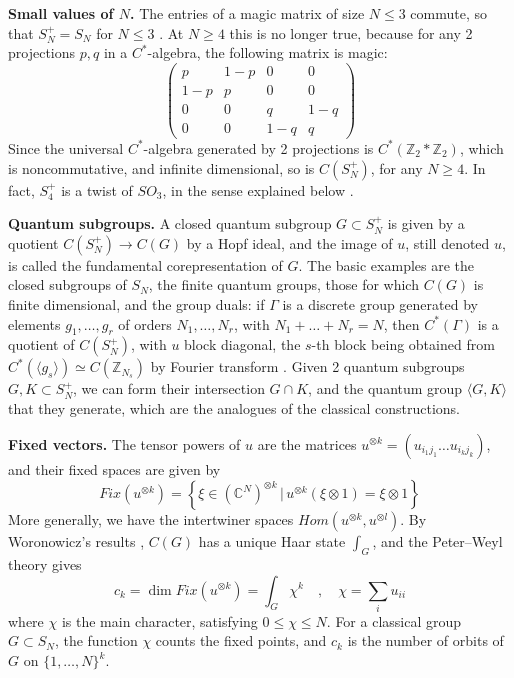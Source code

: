 \documentclass[11pt]{amsart}
\begin{document}
\medskip

\noindent\textbf{Small values of $N$.} The entries of a magic matrix of size $N\leq3$ commute, so that $S_N^+=S_N$ for $N\leq3$ \cite{wa1}. At $N\geq4$ this is no longer true, because for any 2 projections $p,q$ in a $C^*$-algebra, the following matrix is magic:
$$\begin{pmatrix}p&1-p&0&0\\1-p&p&0&0\\0&0&q&1-q\\0&0&1-q&q\end{pmatrix}$$
Since the universal $C^*$-algebra generated by 2 projections is $C^*(\mathbb Z_2*\mathbb Z_2)$, which is noncommutative, and infinite dimensional, so is $C(S_N^+)$, for any $N\geq4$. In fact, $S_4^+$ is a twist of $SO_3$, in the sense explained below \cite{bb2}.

\medskip

\noindent\textbf{Quantum subgroups.} A closed quantum subgroup $G\subset S_N^+$ is given by a quotient $C(S_N^+)\to C(G)$ by a Hopf ideal, and the image of $u$, still denoted $u$, is called the fundamental corepresentation of $G$. The basic examples are the closed subgroups of $S_N$, the finite quantum groups, those for which $C(G)$ is finite dimensional, and the group duals: if $\Gamma$ is a discrete group generated by elements $g_1,\ldots,g_r$ of orders $N_1,\ldots,N_r$, with $N_1+\ldots+N_r=N$, then $C^*(\Gamma)$ is a quotient of $C(S_N^+)$, with $u$ block diagonal, the $s$-th block being obtained from $C^*(\langle g_s\rangle)\simeq C(\mathbb Z_{N_s})$ by Fourier transform \cite{bi1}. Given 2 quantum subgroups $G,K\subset S_N^+$, we can form their intersection $G\cap K$, and the quantum group $\langle G,K\rangle$ that they generate, which are the analogues of the classical constructions.

\medskip

\noindent\textbf{Fixed vectors.} The tensor powers of $u$ are the matrices $u^{\otimes k}=(u_{i_1j_1}\ldots u_{i_kj_k})$, and their fixed spaces are given by
$$Fix(u^{\otimes k})=\left\{\xi\in(\mathbb C^N)^{\otimes k}\,\Big|\,u^{\otimes k}(\xi\otimes1)=\xi\otimes1\right\}$$
More generally, we have the intertwiner spaces $Hom(u^{\otimes k},u^{\otimes l})$. By Woronowicz's results \cite{wo1}, $C(G)$ has a unique Haar state $\int_G$, and the Peter--Weyl theory gives
$$c_k=\dim Fix(u^{\otimes k})=\int_G\chi^k\quad,\quad\chi=\sum_iu_{ii}$$
where $\chi$ is the main character, satisfying $0\leq\chi\leq N$. For a classical group $G\subset S_N$, the function $\chi$ counts the fixed points, and $c_k$ is the number of orbits of $G$ on $\{1,\ldots,N\}^k$.
\end{document}
